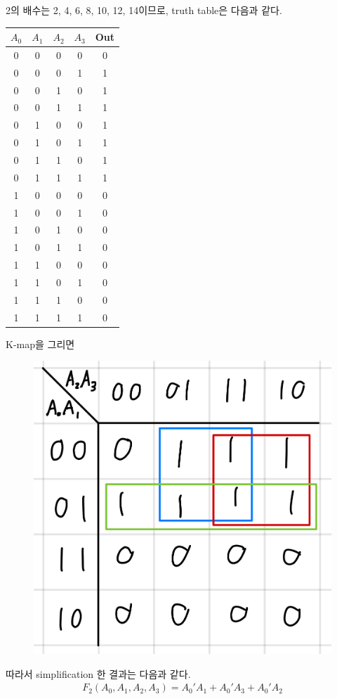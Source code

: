 \documentclass{scrartcl}
\begin{document}
2의 배수는 2, 4, 6, 8, 10, 12, 14이므로, truth table은 다음과 같다.
\begin{table}[H]
  \centering
  \begin{tabular}{|cccc|c|}
    \hline
    \(A_0\) & \(A_1\) & \(A_2\) & \(A_3\) & Out \\
    \hline
    0       & 0       & 0       & 0       & 0   \\
    0       & 0       & 0       & 1       & 1   \\
    0       & 0       & 1       & 0       & 1   \\
    0       & 0       & 1       & 1       & 1   \\
    0       & 1       & 0       & 0       & 1   \\
    0       & 1       & 0       & 1       & 1   \\
    0       & 1       & 1       & 0       & 1   \\
    0       & 1       & 1       & 1       & 1   \\
    1       & 0       & 0       & 0       & 0   \\
    1       & 0       & 0       & 1       & 0   \\
    1       & 0       & 1       & 0       & 0   \\
    1       & 0       & 1       & 1       & 0   \\
    1       & 1       & 0       & 0       & 0   \\
    1       & 1       & 0       & 1       & 0   \\
    1       & 1       & 1       & 0       & 0   \\
    1       & 1       & 1       & 1       & 0   \\
    \hline
  \end{tabular}
\end{table}
K-map을 그리면
\begin{figure}[H]
  \centering
  \includegraphics[width=0.3\linewidth]{lab3_2_2_km}
\end{figure}
따라서 simplification 한 결과는 다음과 같다.
\begin{align*}
  F_2(A_0, A_1, A_2, A_3) = A_0' A_1 + A_0' A_3 + A_0' A_2
\end{align*}
\end{document}
